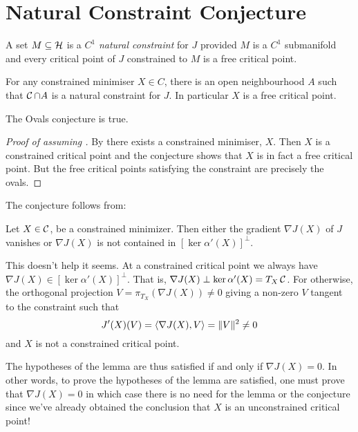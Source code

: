 \documentclass[12pt]{amsart}
\begin{document}
\section{Natural Constraint Conjecture}
\label{sec:nat}

\begin{defn}
A set \(M \subseteq \operatorname{\mathcal{H}}\) is a \(C^1\) \emph{natural constraint} for \(J\) provided \(M\) is a \(C^1\) submanifold and  every critical point of \(J\) constrained to \(M\) is a free critical point.
\end{defn}

\begin{conj}
\label{conj:nat}
For any constrained minimiser $X \in C$, there is an open neighbourhood $A$ such that \(\operatorname{\mathcal{C}} \cap A\) is a natural constraint for \(J\). In particular $X$ is a free critical point.
\end{conj}

\begin{cor}
\label{cor:oval}
The Ovals conjecture is true.
\end{cor}

\begin{proof}[Proof of  assuming ]
By \cite[Theorem 1.1]{denzler2015existence} there exists a constrained minimiser, \(X\). Then $X$ is a constrained critical point and the conjecture shows that $X$ is in fact a free critical point. But the free critical points satisfying the constraint are precisely the ovals.
\end{proof}

The conjecture follows from:

\begin{lem}
\label{lem:transversality}
Let $X \in \operatorname{\mathcal{C}}$, be a constrained minimizer. Then either the gradient \(\nabla J(X)\) of \(J\) vanishes or $\nabla J(X)$ is not contained in $[\ker \alpha'(X)]^{\perp}$.
\end{lem}

{\color{red}
This doesn't help it seems. At a constrained critical point we always have $\nabla J(X) \in [\ker \alpha'(X)]^{\perp}$. That is, $\nabla J(X) \perp \ker\alpha'(X) = T_X \operatorname{\mathcal{C}}$. For otherwise, the orthogonal projection $V = \pi_{T_X} (\nabla J(X)) \ne 0$ giving a non-zero $V$ tangent to the constraint such that
\[
J'(X) (V) = \left\langle{\nabla J(X)},{V}\right\rangle = \|V\|^2 \ne 0
\]
and $X$ is not a constrained critical point.

The hypotheses of the lemma are thus satisfied if and only if $\nabla J(X) = 0$. In other words, to prove the hypotheses of the lemma are satisfied, one must prove that $\nabla J(X) = 0$ in which case there is no need for the lemma or the conjecture since we've already obtained the conclusion that $X$ is an unconstrained critical point!
}
\end{document}
